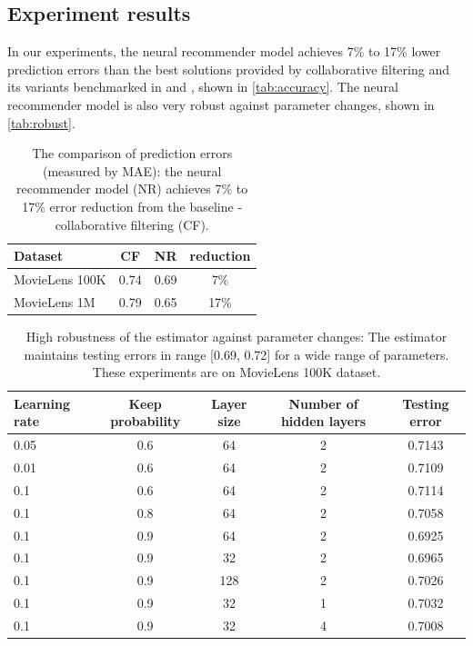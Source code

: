 \documentclass[twocolumn]{article}
\begin{document}
\subsection{Experiment results}
In our experiments, the neural recommender model achieves 7\% to 17\% lower 
prediction errors than the best solutions provided by collaborative filtering 
and its variants benchmarked in \cite{hwang2016efficient} and 
\cite{polatidis2016multi}, shown in \autoref{tab:accuracy}.
The neural recommender model is also very robust against 
parameter changes, shown in \autoref{tab:robust}.
\begin{table}[h]
	\centering
	\caption{The comparison of prediction errors (measured by MAE):
		the neural recommender model (NR) achieves 7\% to 17\% error reduction 
		from the baseline - collaborative filtering (CF).}
	\begin{tabularx}{0.5\textwidth}{ |X|c|c|c| }  \hline
		\textbf{Dataset} & \textbf{CF} & \textbf{NR} & \textbf{reduction} 
		\\ \hline
		MovieLens 100K & 0.74 & 0.69 & 7\% \\ \hline
		MovieLens 1M & 0.79 & 0.65 & 17\% \\ \hline
	\end{tabularx}
	\label{tab:accuracy}
\end{table}
\begin{table}[h]
	\centering
	\caption{High robustness of the estimator against parameter changes:
		The estimator maintains testing errors in range [0.69, 0.72] for a wide 
		range of parameters. These experiments are on MovieLens 100K dataset.}
	\begin{tabularx}{\textwidth}{ |X|c|c|c|c| } \hline
		 \textbf{Learning rate} & \textbf{Keep probability} & \textbf{Layer 
		 size} & \textbf{Number of hidden layers} & \textbf{Testing error} \\ 
		 \hline
		 0.05 & 0.6 & 64 & 2 & 0.7143 \\ \hline
		 0.01 & 0.6 & 64 & 2 & 0.7109 \\ \hline
		 0.1 & 0.6 & 64 & 2 & 0.7114 \\ \hline
		 0.1 & 0.8 & 64 & 2 & 0.7058 \\ \hline
		 0.1 & 0.9 & 64 & 2 & 0.6925 \\ \hline
		 0.1 & 0.9 & 32 & 2 & 0.6965 \\ \hline
		 0.1 & 0.9 & 128 & 2 & 0.7026 \\ \hline
		 0.1 & 0.9 & 32 & 1 & 0.7032 \\ \hline
		 0.1 & 0.9 & 32 & 4 & 0.7008 \\ \hline
	\end{tabularx}
	\label{tab:robust}
\end{table}
\end{document}
